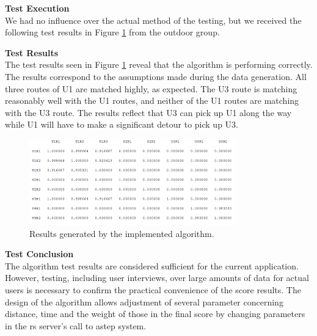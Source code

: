 \textbf{Test Execution}\\
We had no influence over the actual method of the testing, but we received the following test results in Figure \ref{fig:algresults} from the outdoor group.


\textbf{Test Results}\\
The test results seen in Figure \ref{fig:algresults} reveal that the algorithm is performing correctly.
The results correspond to the assumptions made during the data generation.
All three routes of U1 are matched highly, as expected.
The U3 route is matching reasonably well with the U1 routes, and neither of the U1 routes are matching with the U3 route.
The results reflect that U3 can pick up U1 along the way while U1 will have to make a significant detour to pick up U3.

\begin{figure}[h]
	\centering
	\includegraphics[width=0.8\textwidth]{figures/newtestresultrs.png}
	\caption{Results generated by the implemented algorithm.}
	\label{fig:algresults}
\end{figure}


\textbf{Test Conclusion}\\
The algorithm test results are considered sufficient for the current application. 
However, testing, including user interviews, over large amounts of data for actual users is necessary to confirm the practical convenience of the score results.
The design of the algorithm allows adjustment of several parameter concerning distance, time and the weight of those in the final score by changing parameters in the \gls{rs} server's call to \gls{astep} system. 